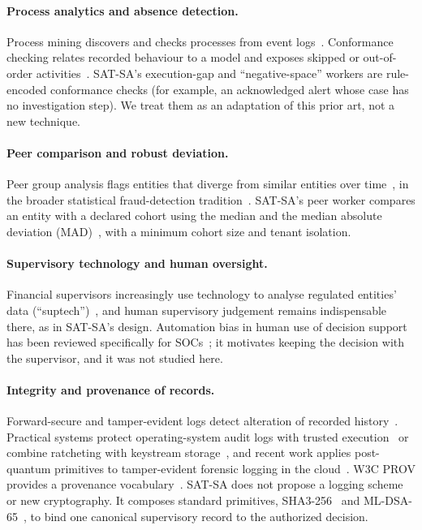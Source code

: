 \paragraph{Process analytics and absence detection.}
Process mining discovers and checks processes from event
logs~\cite{vanderaalst2016pm}. Conformance checking relates recorded behaviour to a
model and exposes skipped or out-of-order
activities~\cite{rozinat2008conformance,carmona2018conformance}. SAT-SA's
execution-gap and ``negative-space'' workers are rule-encoded conformance checks (for
example, an acknowledged alert whose case has no investigation step). We treat them
as an adaptation of this prior art, not a new technique.

\paragraph{Peer comparison and robust deviation.}
Peer group analysis flags entities that diverge from similar entities over
time~\cite{weston2008pga}, in the broader statistical fraud-detection
tradition~\cite{bolton2002fraud}. SAT-SA's peer worker compares an entity with a
declared cohort using the median and the median absolute deviation
(MAD)~\cite{leys2013mad}, with a minimum cohort size and tenant isolation.

\paragraph{Supervisory technology and human oversight.}
Financial supervisors increasingly use technology to analyse regulated entities'
data (``suptech'')~\cite{broeders2018suptech}, and human supervisory judgement
remains indispensable there, as in SAT-SA's design. Automation bias in human use of
decision support~\cite{parasuraman2010automation} has been reviewed specifically for
SOCs~\cite{tilbury2024automationbias}; it motivates keeping the decision with the
supervisor, and it was not studied here.

\paragraph{Integrity and provenance of records.}
Forward-secure and tamper-evident logs detect alteration of recorded
history~\cite{schneier1999logs,crosby2009logging}. Practical systems protect
operating-system audit logs with trusted execution~\cite{paccagnella2020custos} or
combine ratcheting with keystream storage~\cite{guardiola2022sealfs}, and recent work
applies post-quantum primitives to tamper-evident forensic logging in the
cloud~\cite{fugkeaw2026pqabl}. W3C PROV provides a provenance
vocabulary~\cite{w3c2013provdm}. SAT-SA does not propose a logging scheme or new
cryptography. It composes standard primitives, SHA3-256~\cite{nist2015fips202} and
ML-DSA-65~\cite{nist2024fips204}, to bind one canonical supervisory record to the
authorized decision.

